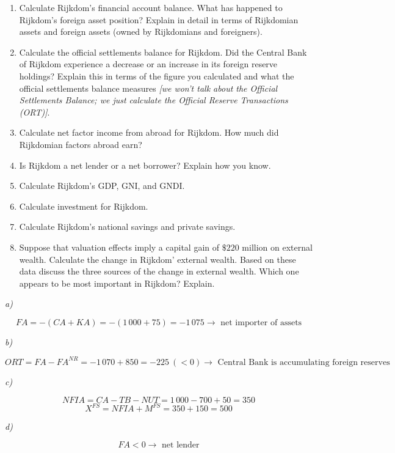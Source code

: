 \documentclass[11pt, a4paper]{article}
\begin{document}
\begin{enumerate}[label=\emph{\alph*}), topsep = \lineskip, itemsep = \lineskip, partopsep = \lineskip, parsep = \lineskip]
	\item Calculate Rijkdom’s financial account balance. What has happened to Rijkdom’s
  foreign asset position? Explain in detail in terms of Rijkdomian assets and foreign
  assets (owned by Rijkdomians and foreigners).
	\item Calculate the official settlements balance for Rijkdom. Did the Central Bank of
  Rijkdom experience a decrease or an increase in its foreign reserve holdings?
  Explain this in terms of the figure you calculated and what the official settlements
  balance measures \textit{[we won't talk about the Official Settlements Balance; we just calculate the Official Reserve Transactions (ORT)]}.
  \item Calculate net factor income from abroad for Rijkdom. How much did Rijkdomian
  factors abroad earn?
  \item Is Rijkdom a net lender or a net borrower? Explain how you know.
  \item Calculate Rijkdom’s GDP, GNI, and GNDI.
  \item Calculate investment for Rijkdom.
  \item Calculate Rijkdom’s national savings and private savings.
  \item Suppose that valuation effects imply a capital gain of $\$ 220$ million on external wealth. Calculate the change in Rijkdom’ external wealth. Based on these data discuss the three sources of the change in external wealth. Which one appears to be most important in Rijkdom? Explain.
\end{enumerate}

\dotfill


\textit{a)}

$$FA = -(CA + KA) = -(1\,000 + 75) = -1\,075 \rightarrow \text{ net importer of assets}$$

\textit{b)}

$$ORT = FA - FA^{NR} = -1\,070 + 850 = -225 \ (<0) \rightarrow \text{ Central Bank is accumulating foreign reserves}$$

\textit{c)}

$$ NFIA = CA - TB - NUT = 1\,000 - 700 + 50 = 350 $$
$$ X^{FS} = NFIA + M^{FS} = 350 + 150 = 500 $$

\textit{d)}

$$ FA < 0 \rightarrow \text{ net lender} $$
\end{document}
